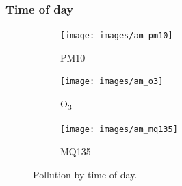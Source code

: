 \documentclass[11pt,twosided,a4paper]{report}
\begin{document}

\subsubsection{Time of day}

\begin{figure}[!tb]
    \centering
      \begin{subfigure}[t]{\linewidth}
      \texttt{[image: images/am\_pm10]}
      \caption{PM10}
      \label{fig:am_pm10}
      \end{subfigure}
    \endminipage\hfill
      \begin{subfigure}[t]{\linewidth}
      \texttt{[image: images/am\_o3]}
      \caption{O\textsubscript{3}}
      \label{fig:am_o3}
      \end{subfigure}
    \endminipage\hfill
      \begin{subfigure}[t]{\linewidth}
      \texttt{[image: images/am\_mq135]}
      \caption{MQ135}
      \label{fig:am_mq135}
      \end{subfigure}
    \endminipage
    \caption[Pollution by time of day.]{Pollution by time of day.}
    \label{fig:am_bars}
\end{figure}
\end{document}
